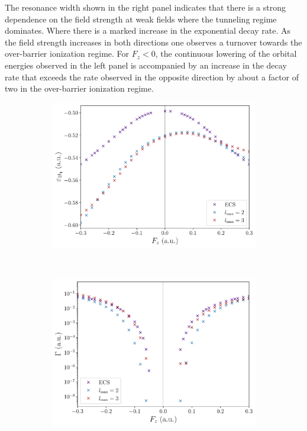 The resonance width shown in the right panel indicates that there is a
strong dependence on the field strength at weak fields where the
tunneling regime dominates. Where there is a marked increase in the
exponential decay rate. As the field strength increases in both
directions one observes a turnover towards the over-barrier ionization
regime. For $F_{z} < 0$, the continuous lowering of the orbital
energies observed in the left panel is accompanied by an increase in
the decay rate that exceeds the rate observed in the opposite
direction by about a factor of two in the over-barrier ionization
regime.




\begin{figure}
  \centering
  \begin{subfigure}[b]{0.45\linewidth}
    \centering
    \includegraphics[width=\textwidth]{figures/ch_H2O/partial_wave/Re1b1l23.pdf}
    \caption{}\label{fig:1b1_cap_re}
  \end{subfigure}
  \,
  \begin{subfigure}[b]{0.45\linewidth}
    \centering
    \includegraphics[width=\textwidth]{figures/ch_H2O/partial_wave/Im1b1l23.pdf}

\end{subfigure}
\end{figure}

